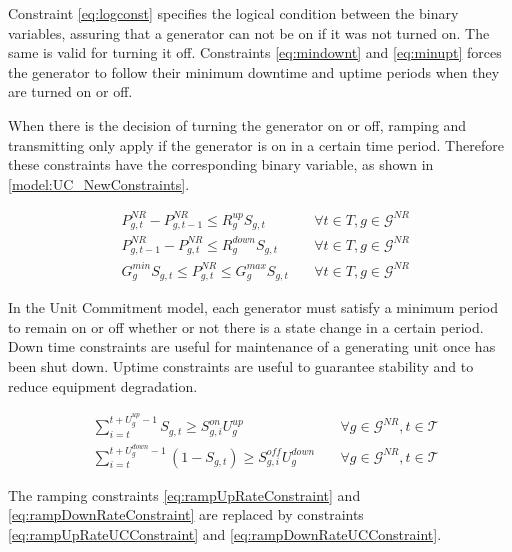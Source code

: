 \documentclass[12pt,LUDisStyle,twosided]{book}
\newcommand{\mc}{\mathcal}
\begin{document}
Constraint \eqref{eq:logconst} specifies the logical condition between the binary variables, assuring that a generator can not be on if it was not turned on. The same is valid for turning it off. Constraints \eqref{eq:mindownt} and \eqref{eq:minupt} forces the generator to follow their minimum downtime and uptime periods when they are turned on or off. 

When there is the decision of turning the generator on or off, ramping and transmitting only apply if the generator is on in a certain time period. Therefore these constraints have the corresponding binary variable, as shown in \eqref{model:UC_NewConstraints}. %

\begin{subequations}\label{model:UC_NewConstraints}
\begin{alignat}{4}
& P^{NR}_{g,t} - P^{NR}_{g,t - 1} \leq R^{up}_{g} S_{g,t} &~& \forall t \in T, g \in \mc{G}^{NR}\label{eq:UCrampUpRateConstraint} \\
& P^{NR}_{g,t -1 } - P^{NR}_{g,t} \leq R^{down}_{g} S_{g,t} &~& \forall t \in T, g \in \mc{G}^{NR}\label{eq:UCrampDownRateConstraint} \\
& G^{min}_{g} S_{g,t}\leq P^{NR}_{g,t} \leq G^{max}_{g} S_{g,t} &~& \forall t \in T, g \in \mc{G}^{NR}\label{eq:UCgenerationBounds}
\end{alignat} 
\end{subequations}

In the Unit Commitment model, each generator must satisfy a minimum period to remain on or off whether  or not there is a state change in a certain period. Down time constraints are useful for maintenance of a generating unit once has been shut down. Uptime constraints are useful to guarantee stability and to reduce equipment degradation. 

\begin{subequations}\label{model:ucMinDownUpConstraints}
\begin{alignat}{4}
& \sum_{i = t}^{t + U^{up}_{g} - 1} S_{g,t} \geq S^{on}_{g,i} U^{up}_{g} &~& \forall g \in \mc{G}^{NR}, t \in \mc{T} \label{eq:mindownt} \\
& \sum_{i = t}^{t + U^{down}_{g} - 1} (1 -S_{g,t}) \geq S^{off}_{g,i} U^{down}_{g} &~& \forall g \in \mc{G}^{NR}, t \in \mc{T} \label{eq:minupt}
\end{alignat} 
\end{subequations}

The ramping constraints \eqref{eq:rampUpRateConstraint} and \eqref{eq:rampDownRateConstraint} are replaced by constraints \eqref{eq:rampUpRateUCConstraint} and \eqref{eq:rampDownRateUCConstraint}.
\end{document}
